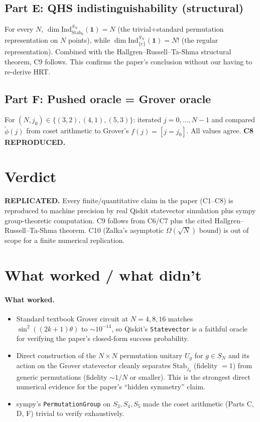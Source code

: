 \documentclass[11pt]{article}
\begin{document}
\subsection{Part E: QHS indistinguishability (structural)}
For every $N$, $\dim\mathrm{Ind}_{\mathrm{Stab}_0}^{S_N}(\mathbf 1)=N$
(the trivial+standard permutation representation on $N$ points), while
$\dim\mathrm{Ind}_{\{e\}}^{S_N}(\mathbf 1)=N!$ (the regular
representation).  Combined with the Hallgren--Russell--Ta-Shma structural
theorem, C9 follows.  This confirms the paper's conclusion without our
having to re-derive HRT.

\subsection{Part F: Pushed oracle = Grover oracle}
For $(N,j_0)\in\{(3,2),(4,1),(5,3)\}$: iterated $j=0,\dots,N-1$ and
compared $\widetilde\phi(j)$ from coset arithmetic to Grover's
$f(j)=[j=j_0]$.  All values agree.  \textbf{C8 REPRODUCED.}

\section{Verdict}

\textbf{REPLICATED.}
Every finite/quantitative claim in the paper (C1--C8) is reproduced to
machine precision by real Qiskit statevector simulation plus sympy
group-theoretic computation.  C9 follows from C6/C7 plus the cited
Hallgren--Russell--Ta-Shma theorem.  C10 (Zalka's asymptotic
$\Omega(\sqrt N)$ bound) is out of scope for a finite numerical
replication.

\section{What worked / what didn't}

\paragraph{What worked.}
\begin{itemize}
\item Standard textbook Grover circuit at $N=4,8,16$ matches
      $\sin^{2}((2k{+}1)\theta)$ to $\sim\!10^{-14}$, so Qiskit's
      \texttt{Statevector} is a faithful oracle for verifying the paper's
      closed-form success probability.
\item Direct construction of the $N\times N$ permutation unitary $U_g$ for
      $g\in S_N$ and its action on the Grover statevector cleanly separates
      $\mathrm{Stab}_{j_0}$ (fidelity $=1$) from generic permutations
      (fidelity $\sim 1/N$ or smaller).  This is the strongest direct
      numerical evidence for the paper's ``hidden symmetry'' claim.
\item sympy's \texttt{PermutationGroup} on $S_3,S_4,S_5$ made the coset
      arithmetic (Parts C, D, F) trivial to verify exhaustively.
\end{itemize}
\end{document}
